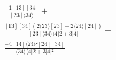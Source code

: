 \documentclass[varwidth, border=5pt]{standalone}
\begin{document}
\begin{my}
$\begin{gathered}
\scriptscriptstyle\frac{-1[13][34]}{[23]⟨34⟩} +\\
\scriptscriptstyle\frac{[13][34](2⟨23⟩[23]-2⟨24⟩[24])}{[23]⟨34⟩⟨4|2+3|4]} +\\
\scriptscriptstyle\frac{-4[14]⟨24⟩²[24][34]}{⟨34⟩⟨4|2+3|4]²} \phantom{+}
\end{gathered}$
\end{my}
\end{document}
